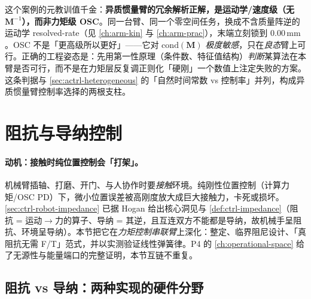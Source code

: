\begin{insight}
这个案例的元教训值千金：\textbf{异质惯量臂的冗余解析正解，是运动学/速度级（无 $\mathbf{M}^{-1}$），而非力矩级 OSC}。同一台臂、同一个零空间任务，换成不含质量阵逆的运动学 resolved-rate（见 \cref{ch:arm-kin} 与 \cref{ch:arm-prac}），末端立刻锁到 $0.00\,\mathrm{mm}$。OSC 不是「更高级所以更好」——它对 $\mathrm{cond}(\mathbf{M})$ \emph{极度敏感}，只在\emph{良态}臂上可行。正确的工程姿态是：先用第一性原理（条件数、特征值结构）\emph{判断}某算法在本臂是否可行，而不是在力矩层反复调正则化「硬刚」一个数值上注定失败的方案。这条判据与 \cref{sec:actrl-heterogeneous} 的「自然时间常数 vs 控制率」并列，构成异质惯量臂控制率选择的两根支柱。
\end{insight}

\section{阻抗与导纳控制}
\label{sec:actrl-impedance}

\paragraph{动机：接触时纯位置控制会「打架」。}
机械臂插轴、打磨、开门、与人协作时要\emph{接触}环境。纯刚性位置控制（计算力矩/OSC PD）下，微小位置误差被高刚度放大成巨大接触力，卡死或损坏。\cref{sec:ctrl-robot-impedance} 已据 Hogan\cite{hogan1985impedance} 给出核心洞见与 \cref{def:ctrl-impedance}（阻抗 = 运动$\to$力的算子、导纳 = 其逆，且互连双方不能都是导纳，故机械手呈阻抗、环境呈导纳）。本节把它在\emph{力矩控制串联臂}上深化：整定、临界阻尼设计、「真阻抗无需 F/T」范式，并以实测验证线性弹簧律。P4 的 \cref{ch:operational-space} 给了无源性与能量端口的完整证明，本节互链不重复。

\subsection{阻抗 vs 导纳：两种实现的硬件分野}
\label{sec:actrl-imp-vs-adm}

